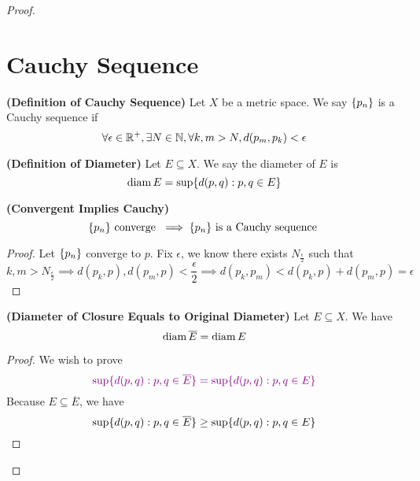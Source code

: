 \documentclass{report}
\begin{document}
\begin{proof}
\section{Cauchy Sequence}
\begin{definition}
\label{3.9.1}
\textbf{(Definition of Cauchy Sequence)} Let $X$ be a metric space. We say $\{ p_n \}$ is a Cauchy sequence if 
\begin{equation}
\forall \epsilon\in\mathbb{R}^+,\exists N\in\mathbb{N}, \forall k,m>N, d(p_m,p_k)<\epsilon 
\end{equation}
\end{definition}
\begin{definition}
\label{3.9.2}
\textbf{(Definition of Diameter)} Let $E\subseteq X$. We say the diameter of $E$ is
 \begin{equation}
\text{diam}\, E=\sup \{ d(p,q):p,q\in E \}
\end{equation}
\end{definition}
\begin{theorem}
\label{3.9.3}
\textbf{(Convergent Implies Cauchy)} 
\begin{equation}
\{ p_n \}\text{ converge }\implies \{ p_n \}\text{ is a Cauchy sequence }
\end{equation}
\end{theorem}
\begin{proof}
Let $\{ p_n \}$ converge to $p$. Fix $\epsilon $, we know there exists $N_{\frac{\epsilon }{2}}$ such that
\begin{equation}
k,m>N_{\frac{\epsilon}{2}}\implies d(p_k,p),d(p_m,p)<\frac{\epsilon}{2}\implies d(p_k,p_m)<d(p_k,p)+d(p_m,p)=\epsilon 
\end{equation}
\end{proof}
\begin{theorem}
\label{3.9.4}
\textbf{(Diameter of Closure Equals to Original Diameter)} Let $E\subseteq X$. We have
\begin{equation}
\text{diam}\, \overline{E}=\text{diam}\, E
\end{equation}
\end{theorem}
\begin{proof}
We wish to prove
\begin{equation}
  \textcolor{violet}{\sup \{ d(p,q):p,q\in \overline{E} \}=\sup \{ d(p,q):p,q\in E \}}
\end{equation}
Because $E\subseteq \overline{E}$, we have
\begin{equation}
\sup \{ d(p,q):p,q\in \overline{E} \}\geq \sup \{ d(p,q):p,q\in E \}
\end{equation}

\end{proof}
\end{proof}
\end{document}
